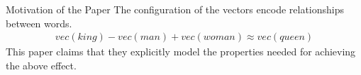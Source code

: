 \begin{frame}{Motivation of the Paper}
  The configuration of the vectors encode relationships between words.
  \begin{align*}
    vec(king) - vec(man) + vec(woman) \approx vec(queen)
  \end{align*}
  This paper claims that they explicitly model the properties needed for achieving the above effect.
\end{frame}

